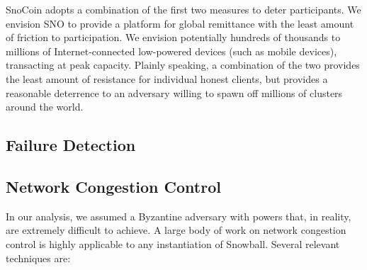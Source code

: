 SnoCoin adopts a combination of the first two measures to deter participants. We envision SNO to provide a platform for global remittance with the least amount of friction to participation. We envision potentially hundreds of thousands to millions of Internet-connected low-powered devices (such as mobile devices), transacting at peak capacity. Plainly speaking, a combination of the two provides the least amount of resistance for individual honest clients, but provides a reasonable deterrence to an adversary willing to spawn off millions of clusters around the world. 



\subsection{Failure Detection}

\subsection{Network Congestion Control}
In our analysis, we assumed a Byzantine adversary with powers that, in reality, are extremely difficult to achieve. A large body of work on network congestion control is highly applicable to any instantiation of Snowball. Several relevant techniques are:
